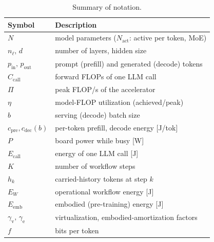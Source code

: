 \documentclass[journal]{IEEEtran}
\begin{document}
\begin{table}[t]
\caption{Summary of notation.}
\label{tab:notation}
\centering
\small
\begin{tabular}{@{}ll@{}}
\toprule
Symbol & Description \\
\midrule
$N$ & model parameters ($N_{\mathrm{act}}$: active per token, MoE) \\
$n_\ell,\, d$ & number of layers, hidden size \\
$p_{\mathrm{in}},\,p_{\mathrm{out}}$ & prompt (prefill) and generated (decode) tokens \\
$C_{\mathrm{call}}$ & forward FLOPs of one LLM call \\
$\Pi$ & peak FLOP/s of the accelerator \\
$\eta$ & model-FLOP utilization (achieved/peak) \\
$b$ & serving (decode) batch size \\
$c_{\mathrm{pre}},c_{\mathrm{dec}}(b)$ & per-token prefill, decode energy [J/tok] \\
$P$ & board power while busy [W] \\
$E_{\mathrm{call}}$ & energy of one LLM call [J] \\
$K$ & number of workflow steps \\
$h_k$ & carried-history tokens at step $k$ \\
$E_W$ & operational workflow energy [J] \\
$E_{\mathrm{emb}}$ & embodied (pre-training) energy [J] \\
$\gamma_{\mathrm{v}},\,\gamma_{\mathrm{e}}$ & virtualization, embodied-amortization factors \\
$f$ & bits per token \\
\bottomrule
\end{tabular}
\end{table}

\end{document}
